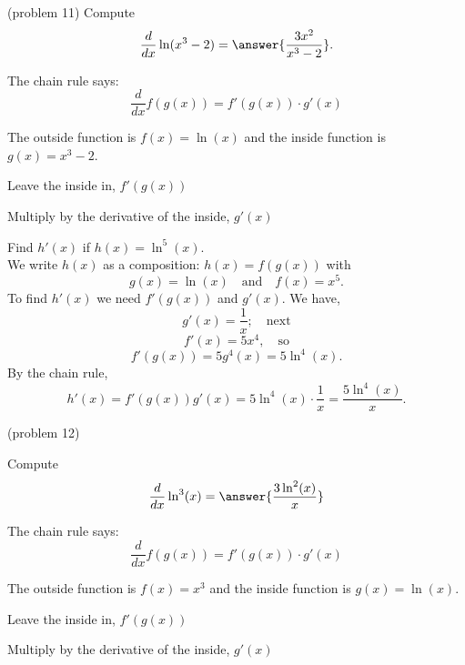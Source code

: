 \documentclass[handout]{ximera}
\begin{document}
\begin{problem}(problem 11)
  Compute
  \[
  \frac{d}{dx} \ln(x^3 -2) = \answer{\frac{3x^2}{x^3 - 2}}.
  \]
  
    \begin{hint}
      The chain rule says:
      \[
      \frac{d}{dx} f(g(x)) = f'(g(x))\cdot g'(x)
      \]
    \end{hint}
    \begin{hint}
      The outside function is $f(x) = \ln(x)$ and the inside
      function is $g(x) = x^3 - 2$.
    \end{hint}
    \begin{hint}
		  Leave the inside in, $f'(g(x))$
		\end{hint}
		\begin{hint}
		  Multiply by the derivative of the inside, $g'(x)$
		\end{hint}
		
\end{problem}



\begin{example}[example 12]
Find $h'(x)$ if $h(x) = \ln^5(x)$.\\
We write $h(x)$ as a composition: $h(x)=f(g(x))$ with 
\[g(x) = \ln(x)  \quad \text{and} \quad  f(x) = x^5.\]
 To find $h'(x)$ we need $f'(g(x))$ and $g'(x)$.  We have, 
\[g'(x) = \frac{1}{x}; \quad \text{next} \] 
\[f'(x) = 5x^4, \quad \text{so} \]
\[f'(g(x)) = 5g^4(x) = 5\ln^4(x).\]
By the chain rule,
\[h'(x) = f'(g(x))g'(x) = 5\ln^4(x)\cdot \frac{1}{x}  = \frac{5\ln^4(x)}{x}.\]
\end{example}

\begin{center}
\begin{foldable}
\end{foldable}
\end{center}


\begin{problem}(problem 12)
  
Compute
  \[
  \frac{d}{dx} \ln^3(x) = \answer{\frac{3\ln^2(x)}{x}}
  \]
  
    \begin{hint}
      The chain rule says:
      \[
      \frac{d}{dx} f(g(x)) = f'(g(x))\cdot g'(x)
      \]
    \end{hint}
    \begin{hint}
      The outside function is $f(x) = x^3$ and the inside
      function is $g(x) = \ln(x)$.
    \end{hint}
    \begin{hint}
		  Leave the inside in, $f'(g(x))$
		\end{hint}
		\begin{hint}
		  Multiply by the derivative of the inside, $g'(x)$
		\end{hint}
		
\end{problem}
\end{document}
